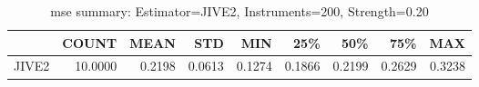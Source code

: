 \begin{table}[ht]
\centering
\caption{mse summary: Estimator=JIVE2, Instruments=200, Strength=0.20}
\begin{tabular}{lrrrrrrrr}
\toprule
 & COUNT & MEAN & STD & MIN & 25\% & 50\% & 75\% & MAX \\
\midrule
JIVE2 & 10.0000 & 0.2198 & 0.0613 & 0.1274 & 0.1866 & 0.2199 & 0.2629 & 0.3238 \\
\bottomrule
\end{tabular}
\end{table}
